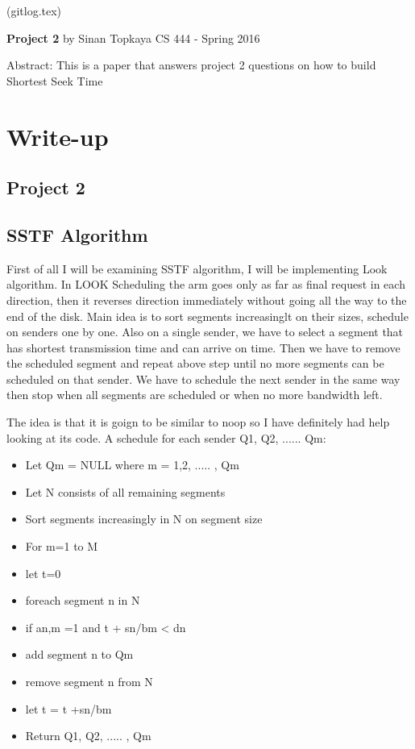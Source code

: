 \documentclass[letterpaper,10pt,draftclsnofoot,onecolumn]{IEEEtran}
\begin{document}
	(gitlog.tex)
	\begin{titlepage}
		
		\begin{center}
		\bigbreak	
		\textbf{Project 2}
		\bigbreak
		by Sinan Topkaya
		\smallbreak
		CS 444 - Spring 2016
		\end{center}
		\vfill
		
		Abstract: This is a paper that answers project 2 questions on how to build Shortest Seek Time	
	\end{titlepage}

\section*{Write-up}
\subsection*{Project 2}


\subsection*{SSTF Algorithm}

First of all I will be examining SSTF algorithm, I will be implementing Look algorithm. In LOOK Scheduling the arm goes only as far as final request in each direction, then it reverses direction immediately without going all the way to the end of the disk. Main idea is to sort segments increasinglt on their sizes, schedule on senders one by one. Also on a single sender, we have to select a segment that has shortest transmission time and can arrive on time. Then we have to remove the scheduled segment and repeat above step until no more segments can be scheduled on that sender. We have to schedule the next sender in the same way then stop when all segments are scheduled or when no more bandwidth left.

The idea is that it is goign to be similar to noop so I have definitely had help looking at its code.
A schedule for each sender Q1, Q2, ...... Qm:
\begin{itemize}
	\item Let Qm = NULL where m = 1,2, ..... , Qm
	\item Let N consists of all remaining segments
	\item Sort segments increasingly in N on segment size
	\item For m=1 to M
	\item 	let t=0
	\item	foreach segment n in N
	\item		if an,m =1 and t + sn/bm < dn
	\item		add segment n to Qm
	\item 		remove segment n from N
	\item		let t = t +sn/bm
	\item Return Q1, Q2, ..... , Qm
\end{itemize}
\end{document}
